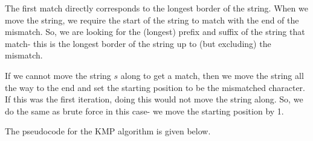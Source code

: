 \documentclass[a4paper, openany]{memoir}
\begin{document}
The first match directly corresponds to the longest border of the string. When we move the string, we require the start of the string to match with the end of the mismatch. So, we are looking for the (longest) prefix and suffix of the string that match- this is the longest border of the string up to (but excluding) the mismatch.

If we cannot move the string $s$ along to get a match, then we move the string all the way to the end and set the starting position to be the mismatched character. If this was the first iteration, doing this would not move the string along. So, we do the same as brute force in this case- we move the starting position by 1.

The pseudocode for the KMP algorithm is given below.

\end{document}

